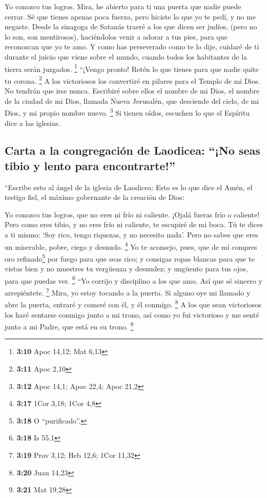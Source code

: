  Yo conozco tus logros. Mira, he abierto para ti una
puerta que nadie puede cerrar. Sé que tienes apenas poca fuerza, pero
hiciste lo que yo te pedí, y no me negaste.  Desde la
sinagoga de Satanás traeré a los que dicen ser judíos, (pero no lo son,
son mentirosos), haciéndolos venir a adorar a tus pies, para que
reconozcan que yo te amo.  Y como has perseverado como te
lo dije, cuidaré de ti durante el juicio que viene sobre el mundo,
cuando todos los habitantes de la tierra serán juzgados. \footnote{\textbf{3:10}
  Apoc 14,12; Mat 6,13}  ``¡Vengo pronto! Retén lo que
tienes para que nadie quite tu corona. \footnote{\textbf{3:11} Apoc 2,10}
 A los victoriosos los convertiré en pilares para el
Templo de mi Dios. No tendrán que irse nunca. Escribiré sobre ellos el
nombre de mi Dios, el nombre de la ciudad de mi Dios, llamada Nueva
Jerusalén, que desciende del cielo, de mi Dios, y mi propio nombre
nuevo. \footnote{\textbf{3:12} Apoc 14,1; Apoc 22,4; Apoc 21,2}
 Si tienen oídos, escuchen lo que el Espíritu dice a las
iglesias.

\hypertarget{carta-a-la-congregaciuxf3n-de-laodicea-no-seas-tibio-y-lento-para-encontrarte}{%
\subsection{Carta a la congregación de Laodicea: ``¡No seas tibio y
lento para
encontrarte!''}\label{carta-a-la-congregaciuxf3n-de-laodicea-no-seas-tibio-y-lento-para-encontrarte}}

 ``Escribe esto al ángel de la iglesia de Laodicea: Esto
es lo que dice el Amén, el testigo fiel, el máximo gobernante de la
creación de Dios:

 Yo conozco tus logros, que no eres ni frío ni caliente.
¡Ojalá fueras frío o caliente!  Pero como eres tibio, y
no eres frío ni caliente, te escupiré de mi boca.  Tú te
dices a ti mismo: `Soy rico, tengo riquezas, y no necesito nada'. Pero
no sabes que eres un miserable, pobre, ciego y desnudo. \footnote{\textbf{3:17}
  1Cor 3,18; 1Cor 4,8}  Yo te aconsejo, pues, que de mí
compres oro refinado\footnote{\textbf{3:18} O ``purificado''.} por fuego
para que seas rico; y consigas ropas blancas para que te vistas bien y
no muestres tu vergüenza y desnudez; y ungüento para tus ojos, para que
puedas ver. \footnote{\textbf{3:18} Is 55,1}  ``Yo
corrijo y disciplino a los que amo. Así que sé sincero y arrepiéntete.
\footnote{\textbf{3:19} Prov 3,12; Heb 12,6; 1Cor 11,32} 
Mira, yo estoy tocando a la puerta. Si alguno oye mi llamado y abre la
puerta, entraré y comeré con él, y él conmigo. \footnote{\textbf{3:20}
  Juan 14,23}  A los que sean victoriosos los haré
sentarse conmigo junto a mi trono, así como yo fui victorioso y me senté
junto a mi Padre, que está en su trono. \footnote{\textbf{3:21} Mat
  19,28}

